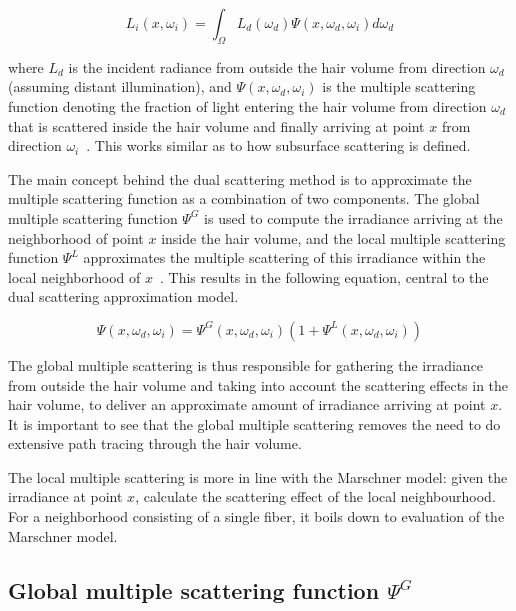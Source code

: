 \begin{equation}
L_i(x, \omega_i) = \int_{\Omega} L_d(\omega_d) \Psi(x, \omega_d, \omega_i) d\omega_d
\end{equation}

where $L_d$ is the incident radiance from outside the hair volume from direction $\omega_d$ (assuming distant illumination), and $\Psi(x, \omega_d, \omega_i)$ is the multiple scattering function denoting the fraction of light entering the hair volume from direction $\omega_d$ that is scattered inside the hair volume and finally arriving at point $x$ from direction $\omega_i$~\cite{zinke}. This works similar as to how subsurface scattering is defined.


%
%

The main concept behind the dual scattering method is to approximate the multiple scattering function as a combination of two components. The global multiple scattering function $\Psi^G$ is used to compute the irradiance arriving at the neighborhood of point $x$ inside the hair volume, and the local multiple scattering function $\Psi^L$ approximates the multiple scattering of this irradiance within the local neighborhood of $x$~\cite{zinke}.
This results in the following equation, central to the dual scattering approximation model.

\begin{equation}
\Psi(x, \omega_d, \omega_i) = \Psi^G(x, \omega_d, \omega_i) (1 + \Psi^L(x, \omega_d, \omega_i))
\end{equation}

The global multiple scattering is thus responsible for gathering the irradiance from outside the hair volume and taking into account the scattering effects in the hair volume, to deliver an approximate amount of irradiance arriving at point $x$. It is important to see that the global multiple scattering removes the need to do extensive path tracing through the hair volume.

The local multiple scattering is more in line with the Marschner model: given the irradiance at point $x$, calculate the scattering effect of the local neighbourhood. For a neighborhood consisting of a single fiber, it boils down to evaluation of the Marschner model.

\subsection{Global multiple scattering function $\Psi^G$}


